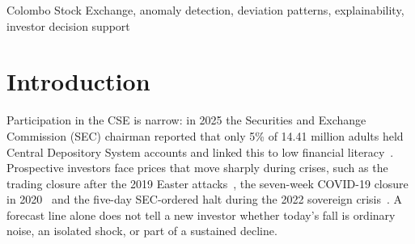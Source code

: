 \documentclass[conference]{IEEEtran}
\begin{document}
\begin{abstract}
Daily price alerts do not explain whether a falling stock has experienced an isolated shock or a sustained departure from its recent pattern. We evaluate a market-evidence workflow for Colombo Stock Exchange investors, combining expected prices, participation-adjusted deviations, calibrated alerts and an offline deviation-pattern extension. Reproduced development experiments use John Keells Holdings and Browns Investments histories through August 2026. After correcting the rolling scale calculation, robust residuals give the highest observed daily harmonic mean of precision and recall, 0.786 and 0.400, against return-based proxy labels. A separate fixed-budget combined rule flags all six documented stock--crisis cases, with 1.93 and 1.98 out-of-episode alerts per 100 sessions. Pattern rules calibrated on earlier observations label five cases but miss two substantial Browns declines, demonstrating why continuous profile statistics should accompany labels. Persistence outperforms the preserved three-month forecasts; attribution fidelity depends strongly on the score being explained. \ReplicationAbstract\ The contribution is an inspectable evidence framework, not established forecasting superiority, causal event identification or validated investor comprehension.
\end{abstract}

\begin{IEEEkeywords}
Colombo Stock Exchange, anomaly detection, deviation patterns, explainability, investor decision support
\end{IEEEkeywords}

\section{Introduction}
Participation in the CSE is narrow: in 2025 the Securities and Exchange Commission (SEC) chairman reported that only 5\% of 14.41 million adults held Central Depository System accounts and linked this to low financial literacy~\cite{dailymirror_literacy2025}. Prospective investors face prices that move sharply during crises, such as the trading closure after the 2019 Easter attacks~\cite{ft_easter2019}, the seven-week COVID-19 closure in 2020~\cite{morning_covid2020} and the five-day SEC-ordered halt during the 2022 sovereign crisis~\cite{bs_halt2022}. A forecast line alone does not tell a new investor whether today's fall is ordinary noise, an isolated shock, or part of a sustained decline.
\end{document}
